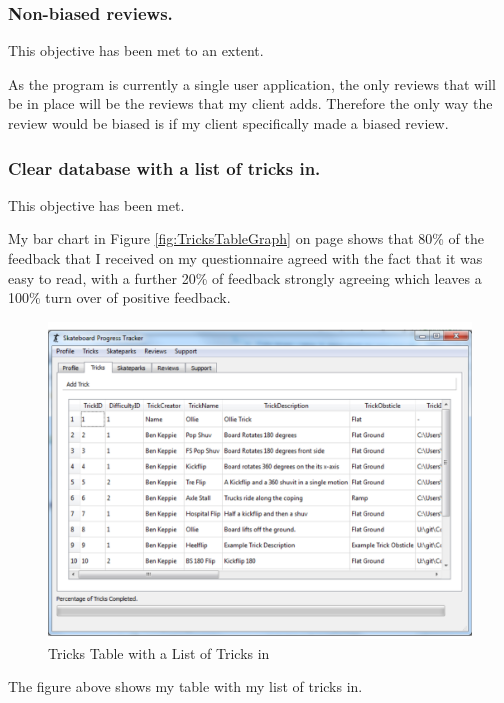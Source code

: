 \subsubsection{Non-biased reviews.}

This objective has been met to an extent. 

As the program is currently a single user application, the only reviews that will be in place will be the reviews that my client adds. Therefore the only way the review would be biased is if my client specifically made a biased review. 



\subsubsection{Clear database with a list of tricks in.} %

This objective has been met.

My bar chart in Figure \ref{fig:TricksTableGraph} on page \pageref{fig:TricksTableGraph} shows that 80\% of the feedback that I received on my questionnaire agreed with the fact that it was easy to read, with a further 20\% of feedback strongly agreeing which leaves a 100\% turn over of positive feedback.


\begin{figure}[H]
    \includegraphics[width=\textwidth]{./Evaluation/images/TricksTableNFS.pdf}
    \caption{Tricks Table with a List of Tricks in} \label{fig:TricksTableEX}
\end{figure}

The figure above shows my table with my list of tricks in.







